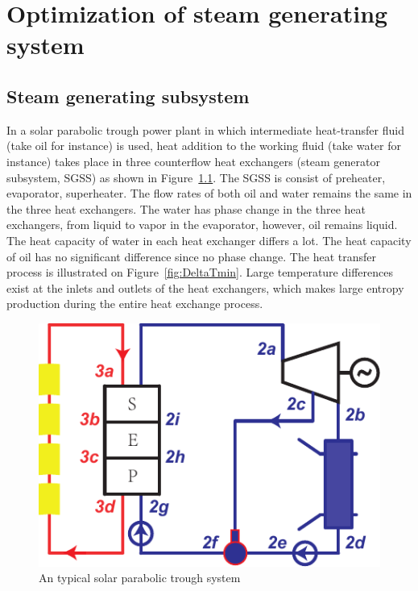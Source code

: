 \chapter{Optimization of steam generating system}
\label{cha:osgs}
\section{Steam generating subsystem}

In a solar parabolic trough power plant in which intermediate heat-transfer fluid (take oil for instance) is used, heat addition to the working fluid (take water for instance) takes place in three counterflow heat exchangers (steam generator subsystem, SGSS) as shown in Figure~\ref{fig:PTC}. The SGSS is consist of preheater, evaporator, superheater. The flow rates of both oil and water remains the same in the three heat exchangers. 
The water has phase change in the three heat exchangers, from liquid to vapor in the evaporator, however, oil remains liquid. The heat capacity of water in each heat exchanger differs a lot. The heat capacity of oil has no significant difference since no phase change. The heat transfer process is illustrated on Figure~\ref{fig:DeltaTmin}. Large temperature differences exist at the inlets and outlets of the heat exchangers, which makes large entropy production during the entire heat exchange process.


\noindent \begin{figure}[htbp]
\begin{center}
	\includegraphics[width = 0.7\columnwidth]{fig/PTC}
	\caption{An typical solar parabolic trough system}
	\label{fig:PTC}
\end{center}
\end{figure}

